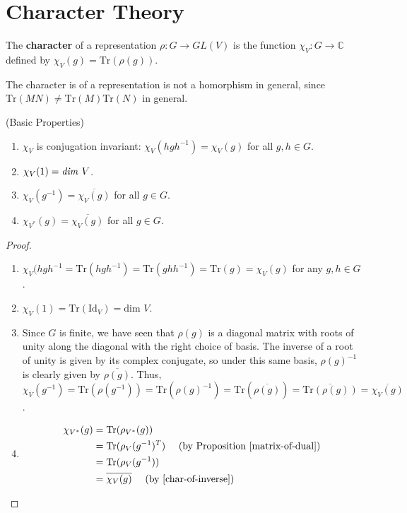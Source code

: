 \section{Character Theory}
\begin{defn}
The \textbf{character} of a representation $\rho \colon G \to GL(V)$ is the function $\chi_V \colon G \to \mathbb{C}$ defined by $\chi_V(g) = \text{Tr}(\rho(g))$.
\end{defn}
\begin{note}
The character is of a representation is not a homorphism in general, since $\text{Tr}(MN) \neq \text{Tr}(M) \text{Tr}(N)$ in general.
\end{note}

\begin{prop}\label{basic-props-of-char} (Basic Properties)
\begin{enumerate}
\item $\chi_V$ is conjugation invariant: $\chi_V (h g h^{-1}) = \chi_V (g)$ for all $g , h \in G$.
\item $\chi_V (1) = \text{\emph{dim }} V$.
\item \label{char-of-inverse} $\chi_V (g^{-1}) = \overline{\chi_V (g)}$ for all $g \in G$.
\item $\chi_{V^*} (g) =  \overline{\chi_V (g)}$ for all $g \in G$.
\end{enumerate}
\end{prop}

\begin{proof}
\begin{enumerate}
\item $\chi_V (h g h^{-1} = \text{Tr}(h g h^{-1}) = \text{Tr}(g h h^{-1}) = \text{Tr} (g) = \chi_V(g)$ for any $g,h \in G$.
\item $\chi_V(1) = \text{Tr}(\text{Id} _V) = \text{dim } V$.
\item Since $G$ is finite, we have seen that $\rho(g)$ is a diagonal matrix with roots of unity along the diagonal with the right choice of basis.  The inverse of a root of unity is given by its complex conjugate, so under this same basis, $\rho(g)^{-1}$ is clearly given by $\overline{\rho(g)}$.  Thus, $\chi_V(g^{-1}) = \text{Tr}(\rho(g^{-1})) = \text{Tr}(\rho(g)^{-1}) = \text{Tr}(\overline{\rho(g)}) = \overline{ \text{Tr} (\rho(g))} = \overline {\chi_V(g)}$.
\item \begin{align*}
 \chi_{V^*}(g) &= \text{Tr}(\rho_{V^*}(g)) \\
 &= \text{Tr}(\rho_V (g^{-1})^T) \quad \text{ (by Proposition \ref{matrix-of-dual})} \\
 &= \text{Tr}(\rho_V(g^{-1})) \\
 &= \overline{\chi_V (g)}  \quad \text{ (by \ref{char-of-inverse})}
\end{align*}
\end{enumerate}
\end{proof}

